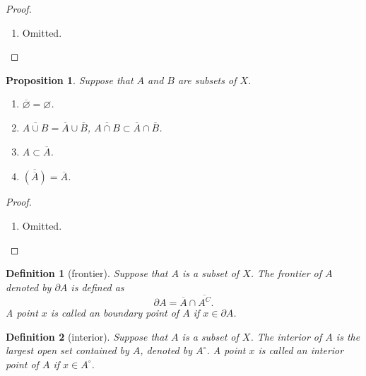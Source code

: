 \documentclass{report}
\newtheorem{definition}{Definition}[section]
\newtheorem{proposition}{Proposition}[section]
\theoremstyle{nonumberplain}
\newtheorem{proof}{Proof.}
\begin{document}
\begin{proof}~\\ \vspace{-1em}
	\begin{enumerate}
		\item Omitted.
	\end{enumerate}
\end{proof}
\begin{proposition}
	Suppose that $A$ and $B$ are subsets of $X$.
	\begin{enumerate}
		\item $\overline{\varnothing}=\varnothing$.
		\item $\overline{A \cup B}=\overline{A}\cup\overline{B}$,  $\overline{A \cap B}\subset\overline{A}\cap\overline{B}$.
		\item $A\subset\overline{A}$.
		\item $\overline{\left(\overline{A}\right)}=\overline{A}$.
	\end{enumerate}
\end{proposition}

\begin{proof}~\\ \vspace{-1em}
	\begin{enumerate}
		\item Omitted.
	\end{enumerate}
\end{proof}

\begin{definition}[frontier]
	Suppose that $A$ is a subset of $X$. The \emph{frontier} of $A$ denoted by $\partial A$ is defined as
	\[
		\partial A=\overline{A}\cap\overline{A^C}.
	\] A point $x$ is called an \emph{boundary point} of $A$ if $x\in \partial A$.
\end{definition}

\begin{definition}[interior]
	Suppose that $A$ is a subset of $X$. The \emph{interior} of $A$ is the largest open set contained by $A$, denoted by $A^{\circ}$. A point $x$ is called an \emph{interior point} of $A$ if $x\in A^{\circ}$.
\end{definition}
\end{document}
